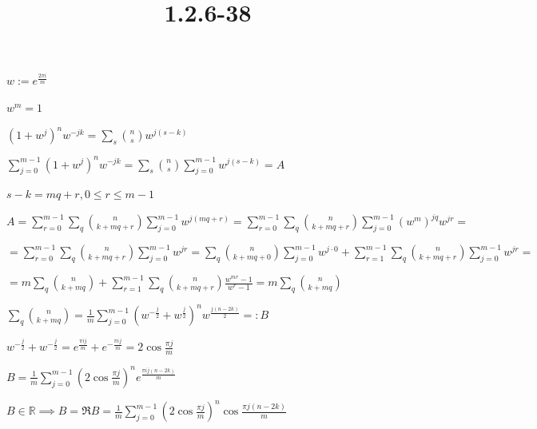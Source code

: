 \documentclass{article}
\title{1.2.6-38}
\begin{document}
\maketitle

$w := e^{\frac{2 \pi i}{m}}$

$w^m = 1$

$(1+w^j)^n w^{-jk} = \sum_{s} \binom{n}{s} w^{j(s-k)}$

$\sum_{j=0}^{m-1} (1+w^j)^n w^{-jk} = \sum_{s} \binom{n}{s} \sum_{j=0}^{m-1} w^{j(s-k)} = A$

$s-k = mq + r, 0 \leq r \leq m - 1$

$A = \sum_{r=0}^{m-1} \sum_{q} \binom{n}{k + mq + r} \sum_{j=0}^{m-1} w^{j(mq+r)} = \sum_{r=0}^{m-1} \sum_{q} \binom{n}{k + mq + r} \sum_{j=0}^{m-1} (w^m)^{jq}w^{jr} =$

$= \sum_{r=0}^{m-1} \sum_{q} \binom{n}{k + mq + r} \sum_{j=0}^{m-1} w^{jr} = \sum_{q} \binom{n}{k + mq + 0} \sum_{j=0}^{m-1} w^{j \cdot 0} + \sum_{r=1}^{m-1} \sum_{q} \binom{n}{k + mq + r} \sum_{j=0}^{m-1} w^{jr} =$

$= m \sum_{q} \binom{n}{k + mq} + \sum_{r=1}^{m-1} \sum_{q} \binom{n}{k + mq + r} \frac{w^{mr} - 1}{w^r - 1} = m \sum_{q} \binom{n}{k + mq}$

$\sum_q \binom{n}{k+mq} = \frac{1}{m} \sum_{j=0}^{m-1} (w^{-\frac{j}{2}}+w^{\frac{j}{2}})^n w^{\frac{j(n-2k)}{2}} =: B$

$w^{-\frac{j}{2}} + w^{-\frac{j}{2}} = e^{\frac{\pi i j}{m}} + e^{-\frac{\pi i j}{m}} = 2 \cos \frac{\pi j}{m}$

$B = \frac{1}{m} \sum_{j=0}^{m-1} (2 \cos \frac{\pi j}{m})^n e^{\frac{\pi i j(n-2k)}{m}}$

$B \in \mathbb{R} \implies B = \Re B = \frac{1}{m} \sum_{j=0}^{m-1} (2 \cos \frac{\pi j}{m})^n \cos \frac{\pi j(n-2k)}{m}$
\end{document}
